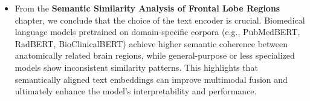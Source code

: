 \documentclass[a4paper,12pt]{article}
\begin{document}
\begin{itemize}
    \item From the \textbf{Semantic Similarity Analysis of Frontal Lobe Regions} chapter, we conclude that the choice of the text encoder is crucial. Biomedical language models pretrained on domain-specific corpora (e.g., PubMedBERT, RadBERT, BioClinicalBERT) achieve higher semantic coherence between anatomically related brain regions, while general-purpose or less specialized models show inconsistent similarity patterns. This highlights that semantically aligned text embeddings can improve multimodal fusion and ultimately enhance the model’s interpretability and performance.
\end{itemize}
\end{document}
